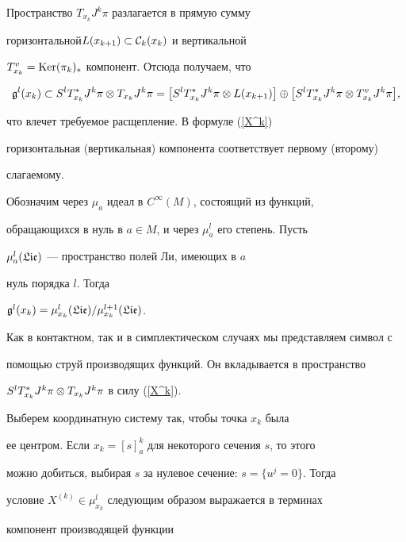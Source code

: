 \begin{pf}


Пространство $T_{x_k}J^k\pi$ разлагается в прямую сумму


горизонтальной\linebreak $L(x_{k+1})\subset{\cal C}_k(x_k)$ и вертикальной


$T_{x_k}^v=\operatorname{Ker}(\pi_k)_*$ компонент. Отсюда получаем, что


$$


\g^l(x_k)\subset S^lT^*_{x_k}J^k\pi\ot T_{x_k}J^k\pi =


\bigl[S^lT^*_{x_k}J^k\pi\ot L(x_{k+1})\bigr]\oplus


\bigl[S^lT^*_{x_k}J^k\pi\ot T_{x_k}^vJ^k\pi\bigr],


$$


что влечет требуемое расщепление. В формуле (\ref{X^k})


горизонтальная (вертикальная) компонента соответствует первому (второму)


слагаемому.





Обозначим через $\mu_a$ идеал в $C^\infty(M)$, состоящий из функций,


обращающихся в нуль в $a\in M$, и через $\mu^l_a$ его степень. Пусть


$\mu_a^l(\frak{Lie})$ --- пространство полей Ли, имеющих в $a$


нуль порядка $l$. Тогда


${\frak g}^l(x_k)=\mu_{x_k}^l(\frak{Lie})/\mu_{x_k}^{l+1}(\frak{Lie})$.





Как в контактном, так и в симплектическом случаях мы представляем символ с


помощью струй производящих функций. Он вкладывается в пространство


$S^lT^*_{x_k}J^k\pi\otimes T_{x_k}J^k\pi$ в силу (\ref{X^k}).





Выберем координатную систему так, чтобы точка $x_k$ была


ее центром. Если $x_k=[s]^k_a$ для некоторого сечения $s$, то этого


можно добиться, выбирая $s$ за нулевое сечение: $s=\{u^j=0\}$. Тогда


условие $X^{(k)}\in\mu^l_{x_k}$ следующим образом выражается в терминах


компонент производящей функции



\end{pf}
